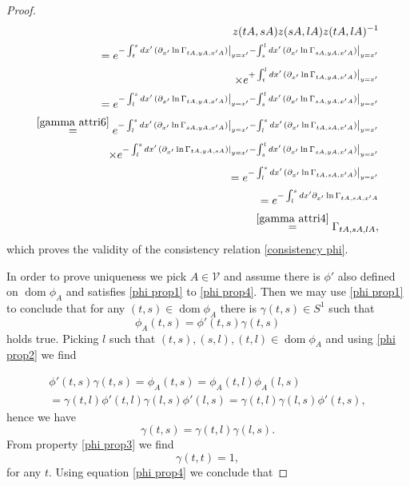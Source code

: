 \documentclass[b5paper,draft,openbib,12pt]{memoir}
\DeclareMathOperator{\dom}{dom}
\begin{document}
\begin{proof}
\begin{align}
z(tA,sA) z(sA,lA)z(tA,lA)^{-1}\\
=e^{-\int_t^s d x' \left.(\partial_{x'} \ln \Gamma_{tA,yA,x'A} )\right|_{y=x'} -\int_s^l d x' \left.(\partial_{x'} \ln \Gamma_{sA,yA,x'A} )\right|_{y=x'} }\\
\times e^{   +\int_t^l d x' \left.(\partial_{x'} \ln \Gamma_{tA,yA,x'A} )\right|_{y=x'}  }\\
=e^{-\int_l^s d x' \left.(\partial_{x'} \ln \Gamma_{tA,yA,x'A} )\right|_{y=x'}  -\int_s^l d x' \left.(\partial_{x'} \ln \Gamma_{sA,yA,x'A} )\right|_{y=x'} }\\
\overset{\eqref{gamma attri6}}{=}
e^{-\int_l^s d x' \left.(\partial_{x'} \ln \Gamma_{sA,yA,x'A} )\right|_{y=x'} 
-\int_l^s d x' \left.(\partial_{x'} \ln \Gamma_{tA,sA,x'A} )\right|_{y=x'}}\\ 
\times e^{-\int_l^s d x' \left.(\partial_{x'} \ln \Gamma_{tA,yA,sA} )\right|_{y=x'} 
 -\int_s^l d x' \left.(\partial_{x'} \ln \Gamma_{sA,yA,x'A} )\right|_{y=x'} }\\
 =e^{-\int_l^s d x' \left.(\partial_{x'} \ln \Gamma_{tA,sA,x'A} )\right|_{y=x'}}\\
  =e^{-\int_l^s d x'\partial_{x'} \ln \Gamma_{tA,sA,x'A} }\\
  \overset{\eqref{gamma attri4}}{=}\Gamma_{t A, s A, l A},
\end{align}
which proves the validity of the consistency relation 
\eqref{consistency phi}.

In order to prove uniqueness we pick \(A\in \mathcal{V}\) 
and assume there is \(\phi'\) also defined on \(\dom \phi_A\) 
and satisfies \eqref{phi prop1} to \eqref{phi prop4}. Then we may 
use \eqref{phi prop1} to conclude that for any \((t,s)\in\dom\phi_A\) 
there is
\(\gamma(t,s)\in S^1\) such that
\begin{equation}
\phi_A(t,s)=\phi'(t,s) \gamma(t,s)
\end{equation}
holds true. Picking \(l\) such that \((t,s),(s,l),(t,l)\in \dom\phi_A\) and  using \eqref{phi prop2} we find

\begin{align}
\phi'(t,s) \gamma(t,s)=\phi_A(t,s)=\phi_A(t,l)\phi_A(l,s)\\
=\gamma(t,l)\phi'(t,l) \gamma(l,s)\phi'(l,s)=\gamma(t,l) \gamma(l,s)\phi'(t,s) ,
\end{align}
hence we have
\begin{equation}
 \gamma(t,s)=\gamma(t,l) \gamma(l,s).
\end{equation}
From property \eqref{phi prop3} we find
\begin{equation}
\gamma(t,t)=1,
\end{equation}
for any \(t\).
Using equation \eqref{phi prop4} we conclude that 


\end{proof}
\end{document}
